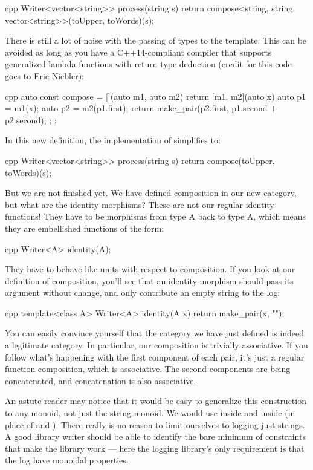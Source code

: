 \begin{snip}{cpp}
Writer<vector<string>> process(string s) {
    return compose<string, string, vector<string>>(toUpper, toWords)(s);
}
\end{snip}
There is still a lot of noise with the passing of types to the
 template. This can be avoided as long as you have a
C++14-compliant compiler that supports generalized lambda functions with
return type deduction (credit for this code goes to Eric Niebler):

\begin{snip}{cpp}
auto const compose = [](auto m1, auto m2) {
    return [m1, m2](auto x) {
        auto p1 = m1(x);
        auto p2 = m2(p1.first);
        return make_pair(p2.first, p1.second + p2.second);
    };
};
\end{snip}
In this new definition, the implementation of 
simplifies to:

\begin{snip}{cpp}
Writer<vector<string>> process(string s) {
    return compose(toUpper, toWords)(s);
}
\end{snip}
But we are not finished yet. We have defined composition in our new
category, but what are the identity morphisms? These are not our regular
identity functions! They have to be morphisms from type A back to type
A, which means they are embellished functions of the form:

\begin{snip}{cpp}
Writer<A> identity(A);
\end{snip}
They have to behave like units with respect to composition. If you look
at our definition of composition, you'll see that an identity morphism
should pass its argument without change, and only contribute an empty
string to the log:

\begin{snip}{cpp}
template<class A>
Writer<A> identity(A x) {
    return make_pair(x, "");
}
\end{snip}
You can easily convince yourself that the category we have just defined
is indeed a legitimate category. In particular, our composition is
trivially associative. If you follow what's happening with the first
component of each pair, it's just a regular function composition, which
is associative. The second components are being concatenated, and
concatenation is also associative.

An astute reader may notice that it would be easy to generalize this
construction to any monoid, not just the string monoid. We would use
 inside  and  inside
 (in place of \code{+} and ). There really
is no reason to limit ourselves to logging just strings. A good library
writer should be able to identify the bare minimum of constraints that
make the library work --- here the logging library's only requirement is
that the log have monoidal properties.

